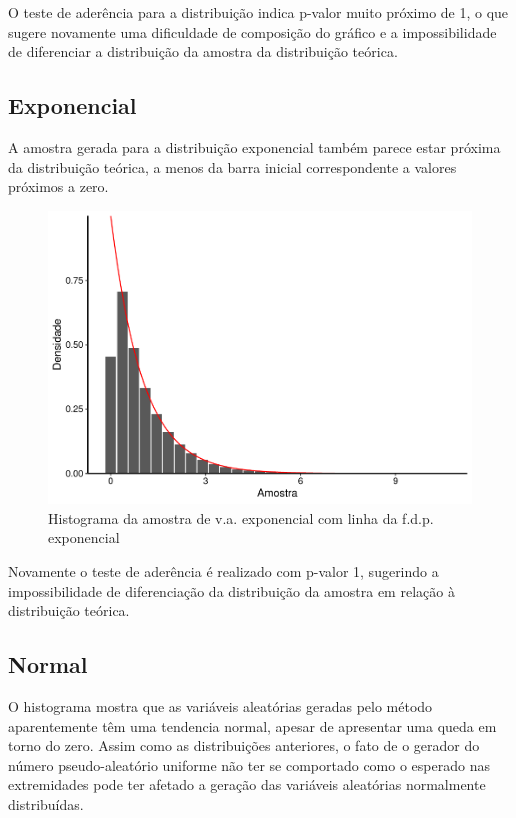 \documentclass[
]{article}
\begin{document}
O teste de aderência para a distribuição indica p-valor muito próximo de
1, o que sugere novamente uma dificuldade de composição do gráfico e a
impossibilidade de diferenciar a distribuição da amostra da distribuição
teórica.

\pagebreak

\hypertarget{exponencial}{%
\subsection{Exponencial}\label{exponencial}}

A amostra gerada para a distribuição exponencial também parece estar
próxima da distribuição teórica, a menos da barra inicial correspondente
a valores próximos a zero.

\begin{figure}

{\centering \includegraphics[width=0.7\linewidth]{relatorio_tp2_files/figure-latex/resultados-exp-1} 

}

\caption{Histograma da amostra de v.a. exponencial com linha da f.d.p. exponencial}\label{fig:resultados-exp}
\end{figure}

Novamente o teste de aderência é realizado com p-valor 1, sugerindo a
impossibilidade de diferenciação da distribuição da amostra em relação à
distribuição teórica.

\newpage

\hypertarget{normal}{%
\subsection{Normal}\label{normal}}

O histograma mostra que as variáveis aleatórias geradas pelo método
aparentemente têm uma tendencia normal, apesar de apresentar uma queda
em torno do zero. Assim como as distribuições anteriores, o fato de o
gerador do número pseudo-aleatório uniforme não ter se comportado como o
esperado nas extremidades pode ter afetado a geração das variáveis
aleatórias normalmente distribuídas.
\end{document}
